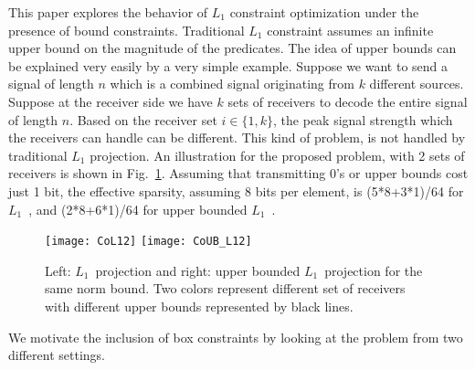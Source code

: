 \documentclass{article}
\def\Lo{$L_1$~}
\begin{document}
This paper explores the behavior of $L_1$ constraint optimization under the presence of bound constraints. Traditional $L_1$ constraint assumes an infinite upper bound on the magnitude of the predicates.
The idea of upper bounds can be explained very easily by a very simple example. Suppose we want to send a signal of length $n$ which is a combined signal originating from $k$ different sources. Suppose at the receiver side we have $k$ sets of receivers to decode the entire signal of length $n$. Based on the receiver set $i\in\{1,k\}$, the peak signal strength which the receivers can handle can be different. This kind of problem, is not handled by traditional $L_1$ projection. An illustration for the proposed problem, with 2 sets of receivers is shown in Fig.~\ref{Fig:algo1_expl3434345}. Assuming that transmitting 0's or upper bounds cost just 1 bit, the effective sparsity, assuming 8 bits per element, is (5*8+3*1)/64 for \Lo, and (2*8+6*1)/64 for upper bounded \Lo.
\begin{figure}[htbp!]
\texttt{[image: CoL12]}
  \texttt{[image: CoUB\_L12]}
  \caption{Left: \Lo projection and right: upper bounded \Lo projection for the same norm bound. Two colors represent different set of receivers with different upper bounds represented by black lines. \label{Fig:algo1_expl3434345}
}
\end{figure} 
We motivate the inclusion of box constraints by looking at the problem from two different settings.
\end{document}
